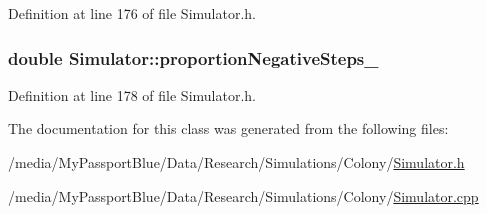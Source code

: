\-Definition at line 176 of file \-Simulator.\-h.

\hypertarget{class_simulator_a6ef401f07d2c71aa6b2dedfdc8598483}{
\subsubsection[{proportion\-Negative\-Steps\-\_\-}]{\setlength{\rightskip}{0pt plus 5cm}double {\bf \-Simulator\-::proportion\-Negative\-Steps\-\_\-}}}\label{class_simulator_a6ef401f07d2c71aa6b2dedfdc8598483}


\-Definition at line 178 of file \-Simulator.\-h.



\-The documentation for this class was generated from the following files\-:\begin{DoxyCompactItemize}
\item 
/media/\-My\-Passport\-Blue/\-Data/\-Research/\-Simulations/\-Colony/\hyperlink{_simulator_8h}{\-Simulator.\-h}\item 
/media/\-My\-Passport\-Blue/\-Data/\-Research/\-Simulations/\-Colony/\hyperlink{_simulator_8cpp}{\-Simulator.\-cpp}\end{DoxyCompactItemize}

